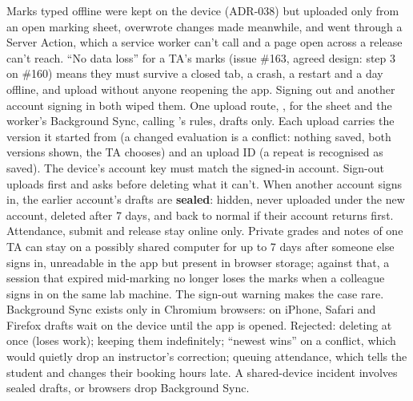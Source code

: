   {Marks typed offline were kept on the device (ADR-038) but uploaded only from an open marking
   sheet, overwrote changes made meanwhile, and went through a Server Action, which a service
   worker can't call and a page open across a release can't reach. ``No data loss'' for a TA's
   marks (issue \#163, agreed design: step 3 on \#160) means they must survive a closed tab, a
   crash, a restart and a day offline, and upload without anyone reopening the app. Signing out
   and another account signing in both wiped them.}
  {One upload route, , for the sheet and the worker's Background
   Sync, calling 's rules, drafts only. Each upload carries the version it
   started from (a changed evaluation is a conflict: nothing saved, both versions shown, the TA
   chooses) and an upload ID (a repeat is recognised as saved). The device's account key must
   match the signed-in account. Sign-out uploads first and asks before deleting what it can't.
   When another account signs in, the earlier account's drafts are \textbf{sealed}: hidden,
   never uploaded under the new account, deleted after 7 days, and back to normal if their
   account returns first. Attendance, submit and release stay online only.}
  {Private grades and notes of one TA can stay on a possibly shared computer for up to 7 days
   after someone else signs in, unreadable in the app but present in browser storage; against
   that, a session that expired mid-marking no longer loses the marks when a colleague signs in
   on the same lab machine. The sign-out warning makes the case rare. Background Sync exists
   only in Chromium browsers: on iPhone, Safari and Firefox drafts wait on the device until the
   app is opened. Rejected: deleting at
   once (loses work); keeping them indefinitely; ``newest wins'' on a conflict, which would
   quietly drop an instructor's correction; queuing attendance, which tells the student and
   changes their booking hours late.}
  {A shared-device incident involves sealed drafts, or browsers drop Background Sync.}

